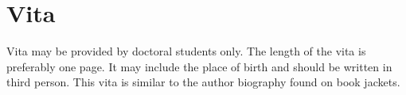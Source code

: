 \chapter*{Vita}
Vita may be provided by doctoral students only. The length of the vita is preferably one page. It may include the place of birth and should be written in third person. This vita is similar to the author biography found on book jackets.
